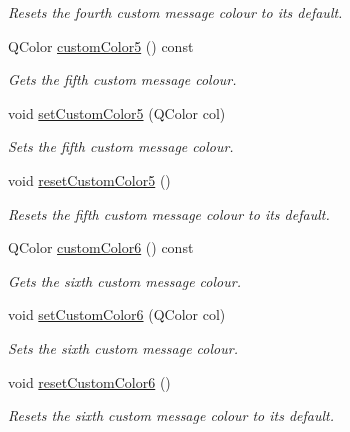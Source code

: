 \begin{DoxyCompactItemize}
\begin{DoxyCompactList}\small\item\em Resets the fourth custom message colour to its default. \end{DoxyCompactList}\item 
Q\-Color \hyperlink{class_console_widget_a57756fc88c1196455c2afa370556a71d}{custom\-Color5} () const 
\begin{DoxyCompactList}\small\item\em Gets the fifth custom message colour. \end{DoxyCompactList}\item 
void \hyperlink{class_console_widget_a361194a1e900563462e7639331e1fb4c}{set\-Custom\-Color5} (Q\-Color col)
\begin{DoxyCompactList}\small\item\em Sets the fifth custom message colour. \end{DoxyCompactList}\item 
\hypertarget{class_console_widget_a30cf8697ccef1adbd6b21a91ca4aceb1}{void \hyperlink{class_console_widget_a30cf8697ccef1adbd6b21a91ca4aceb1}{reset\-Custom\-Color5} ()}\label{class_console_widget_a30cf8697ccef1adbd6b21a91ca4aceb1}

\begin{DoxyCompactList}\small\item\em Resets the fifth custom message colour to its default. \end{DoxyCompactList}\item 
Q\-Color \hyperlink{class_console_widget_ac5e34f19cc36cdd4b4dac3566c2eaf64}{custom\-Color6} () const 
\begin{DoxyCompactList}\small\item\em Gets the sixth custom message colour. \end{DoxyCompactList}\item 
void \hyperlink{class_console_widget_a6ce29c64f664955b37065c7ba84bfd00}{set\-Custom\-Color6} (Q\-Color col)
\begin{DoxyCompactList}\small\item\em Sets the sixth custom message colour. \end{DoxyCompactList}\item 
\hypertarget{class_console_widget_a2e8fe2f9d7e27f923294a93be8c4f702}{void \hyperlink{class_console_widget_a2e8fe2f9d7e27f923294a93be8c4f702}{reset\-Custom\-Color6} ()}\label{class_console_widget_a2e8fe2f9d7e27f923294a93be8c4f702}

\begin{DoxyCompactList}\small\item\em Resets the sixth custom message colour to its default. \end{DoxyCompactList}\end{DoxyCompactItemize}
